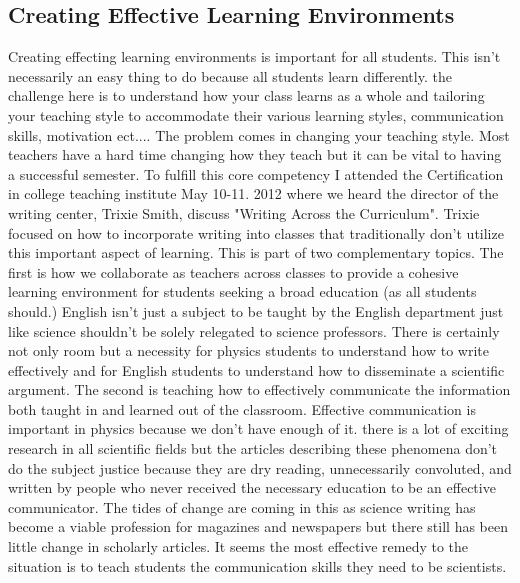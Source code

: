 \documentclass{article}
\begin{document}
\subsection{Creating Effective Learning Environments}
\hspace{0.5cm}Creating effecting learning environments is important for all students. This isn't necessarily an easy thing to do because all students learn differently. the challenge here is to understand how your class learns as a whole and tailoring your teaching style to accommodate their various learning styles, communication skills, motivation ect.... The problem comes in changing your teaching style. Most teachers have a hard time changing how they teach but it can be vital to having a successful semester. 
To fulfill this core competency I attended the Certification in college teaching institute May 10-11. 2012 where we heard the director of the writing center, Trixie Smith, discuss "Writing Across the Curriculum". Trixie focused on how to incorporate writing into classes that traditionally don't utilize this important aspect of learning. This is part of two complementary topics. The first is how we collaborate as teachers across classes to provide a cohesive learning environment for students seeking a broad education (as all students should.) English isn't just a subject to be taught by the English department just like science shouldn't be solely relegated to science professors. There is certainly not only room but a necessity for physics students to understand how to write effectively and for English students to understand how to disseminate a scientific argument. The second is teaching how to effectively communicate the information both taught in and learned out of the classroom. 
Effective communication is important in physics because we don't have enough of it. there is a lot of exciting research in all scientific fields but the articles describing these phenomena don't do the subject justice because they are dry reading, unnecessarily convoluted, and written by people who never received the necessary education to be an effective communicator. The tides of change are coming in this as science writing has become a viable profession for magazines and newspapers but there still has been little change in scholarly articles. It seems the most effective remedy to the situation is to teach students the communication skills they need to be scientists. 
\end{document}
